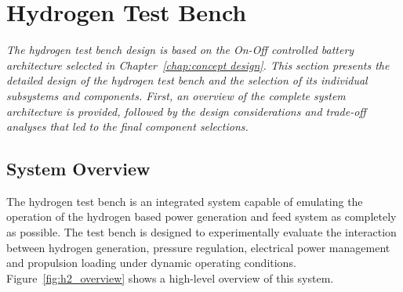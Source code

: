 
\section{Hydrogen Test Bench}%
\label{sec:h2 design}%
\emph{The hydrogen test bench design is based on the On-Off controlled battery architecture selected in Chapter~\ref{chap:concept design}. This section presents the detailed design of the hydrogen test bench and the selection of its individual subsystems and components. First, an overview of the complete system architecture is provided, followed by the design considerations and trade-off analyses that led to the final component selections.}

\subsection*{System Overview}

The hydrogen test bench is an integrated system capable of emulating the operation of the hydrogen based power generation and feed system as completely as possible. The test bench is designed to experimentally evaluate the interaction between hydrogen generation, pressure regulation, electrical power management and propulsion loading under dynamic operating conditions. Figure~\ref{fig:h2_overview} shows a high-level overview of this system.

